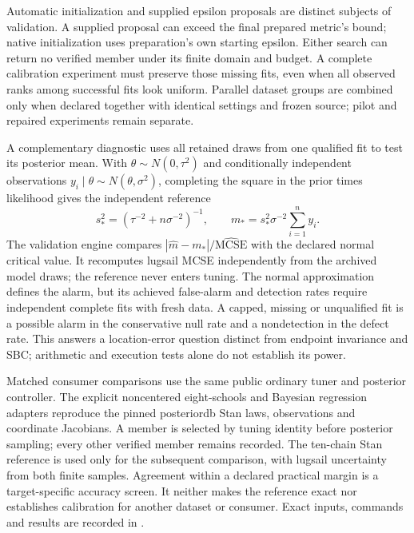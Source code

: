 Automatic initialization and supplied epsilon proposals are distinct subjects
of validation. A supplied proposal can exceed the final prepared metric's bound;
native initialization uses preparation's own starting epsilon. Either search
can return no verified member under its finite domain and budget. A complete
calibration experiment must preserve those missing fits, even when all observed
ranks among successful fits look uniform. Parallel dataset groups are combined
only when declared together with identical settings and frozen source; pilot and
repaired experiments remain separate.

A complementary diagnostic uses all retained draws from one qualified fit to
test its posterior mean. With $\theta\sim N(0,\tau^2)$ and conditionally
independent observations $y_i\mid\theta\sim N(\theta,\sigma^2)$, completing
the square in the prior times likelihood gives the independent reference
\[
 s_*^2=(\tau^{-2}+n\sigma^{-2})^{-1},\qquad
 m_*=s_*^2\sigma^{-2}\sum_{i=1}^n y_i.
\]
The validation engine  compares
$|\widehat m-m_*|/\widehat{\mathrm{MCSE}}$ with the declared normal critical
value. It recomputes lugsail MCSE independently from the archived model draws;
the reference never enters tuning. The normal approximation defines the alarm,
but its achieved false-alarm and detection rates require independent complete
fits with fresh data. A capped, missing or unqualified fit is a possible alarm
in the conservative null rate and a nondetection in the defect rate. This
answers a location-error question distinct from endpoint invariance and SBC;
arithmetic and execution tests alone do not establish its power.

Matched consumer comparisons use the same public ordinary tuner and posterior
controller. The explicit noncentered eight-schools and Bayesian regression
adapters reproduce the pinned posteriordb Stan laws, observations and coordinate
Jacobians. A member is selected by tuning identity before posterior sampling;
every other verified member remains recorded. The ten-chain Stan reference is
used only for the subsequent comparison, with lugsail uncertainty from both
finite samples. Agreement within a declared practical margin is a
target-specific accuracy screen. It neither makes the reference exact nor
establishes calibration for another dataset or consumer. Exact inputs, commands
and results are recorded in
.

